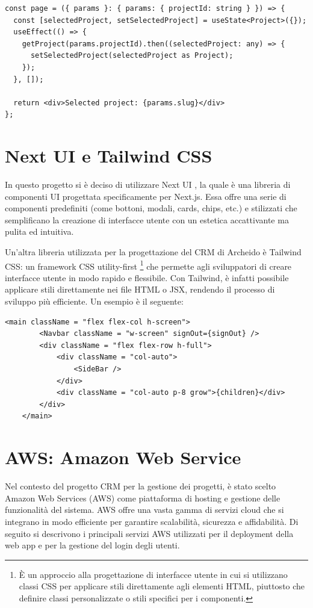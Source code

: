 \documentclass[target=bach,aauheader=,style=]{thud}
\begin{document}
\begin{lstlisting}[caption=Routing dinamico con Next.js]
const page = ({ params }: { params: { projectId: string } }) => {
  const [selectedProject, setSelectedProject] = useState<Project>({});
  useEffect(() => {
    getProject(params.projectId).then((selectedProject: any) => {
      setSelectedProject(selectedProject as Project);
    });
  }, []);

  return <div>Selected project: {params.slug}</div>
};
\end{lstlisting}



\section{Next UI e Tailwind CSS}
In questo progetto si è deciso di utilizzare Next UI \cite{nextui2024}, la quale è una libreria di componenti UI progettata specificamente per Next.js. Essa offre una serie di componenti predefiniti (come bottoni, modali, cards, chips, etc.) e stilizzati che semplificano la creazione di interfacce utente con un estetica accattivante ma pulita ed intuitiva. 

\noindent Un'altra libreria utilizzata per la progettazione del CRM di Archeido è Tailwind CSS: un framework CSS utility-first \footnote{È un approccio alla progettazione di interfacce utente in cui si utilizzano classi CSS per applicare stili direttamente agli elementi HTML, piuttosto che definire classi personalizzate o stili specifici per i componenti.} che permette agli sviluppatori di creare interfacce utente in modo rapido e flessibile. Con Tailwind, è infatti possibile applicare stili direttamente nei file HTML o JSX, rendendo il processo di sviluppo più efficiente. Un esempio è il seguente:

\begin{lstlisting}[caption=Parte del file \texttt{app.tsx} del CRM]
    <main className = "flex flex-col h-screen">
        <Navbar className = "w-screen" signOut={signOut} />
        <div className = "flex flex-row h-full">
            <div className = "col-auto">
                <SideBar />
            </div>
            <div className = "col-auto p-8 grow">{children}</div>
        </div>
    </main> 
\end{lstlisting}


\section{AWS: Amazon Web Service}
Nel contesto del progetto CRM per la gestione dei progetti, è stato scelto Amazon Web Services (AWS) come piattaforma di hosting e gestione delle funzionalità del sistema. AWS offre una vasta gamma di servizi cloud che si integrano in modo efficiente per garantire scalabilità, sicurezza e affidabilità. Di seguito si descrivono i principali servizi AWS utilizzati per il deployment della web app e per la gestione del login degli utenti.
\end{document}
